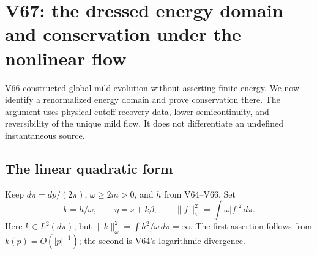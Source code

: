 \documentclass[11pt]{article}
\theoremstyle{remark}
\begin{document}
\section{V67: the dressed energy domain and conservation under the nonlinear flow}
\label{sec:v20v67}

V66 constructed global mild evolution without asserting finite
energy.  We now identify a renormalized energy domain and prove
conservation there.  The argument uses physical cutoff recovery
data, lower semicontinuity, and reversibility of the unique mild
flow.  It does not differentiate an undefined instantaneous source.

\subsection{The linear quadratic form}

Keep \(d\pi=dp/(2\pi)\), \(\omega\geq2m>0\), and \(h\)
from V64--V66.  Set
\[
 k=h/\omega,\qquad \eta=s+k\beta,\qquad
 \|f\|_\omega^2=\int\omega|f|^2\,d\pi .
\]
Here \(k\in L^2(d\pi)\), but
\(\|k\|_\omega^2=\int h^2/\omega\,d\pi=\infty\).
The first assertion follows from \(k(p)=O(|p|^{-1})\);
the second is V64's logarithmic divergence.
\end{document}

